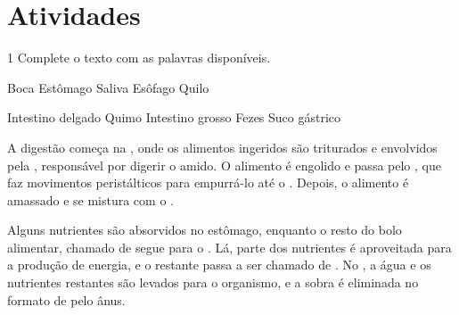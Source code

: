 
\pagebreak
\section*{Atividades}

\num{1} Complete o texto com as palavras disponíveis.

\begin{mdframed}[linewidth=2pt,linecolor=salmao,backgroundcolor=salmao!20]
Boca \hfill Estômago \hfill Saliva \hfill Esôfago \hfill Quilo \hfill

\noindent{}Intestino delgado \hfill Quimo \hfill Intestino grosso \hfill Fezes \hfill Suco gástrico \hfill
\end{mdframed}

\begin{myquote}
A digestão começa na , onde os alimentos ingeridos são triturados e envolvidos pela , responsável por digerir o amido. O alimento é engolido e passa pelo , que faz movimentos peristálticos para empurrá-lo até o . Depois, o alimento é amassado e se mistura com o .

Alguns nutrientes são absorvidos no estômago, enquanto o resto do bolo alimentar, chamado de  segue para o . Lá, parte dos nutrientes é aproveitada para a produção de energia, e o restante passa a ser chamado de . No , a água e os nutrientes restantes são levados para o organismo, e a sobra é eliminada no formato de  pelo ânus.
\end{myquote}

